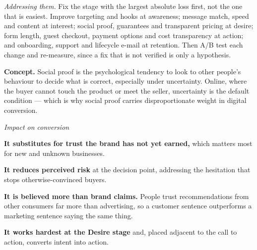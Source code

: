 \begin{qlist}
\textit{Addressing them.} Fix the stage with the largest absolute loss first,
not the one that is easiest. Improve targeting and hooks at awareness; message
match, speed and content at interest; social proof, guarantees and transparent
pricing at desire; form length, guest checkout, payment options and cost
transparency at action; and onboarding, support and lifecycle e-mail at
retention. Then A/B test each change and re-measure, since a fix that is not
verified is only a hypothesis.

\textbf{Concept.} Social proof is the psychological tendency to look to other
people's behaviour to decide what is correct, especially under uncertainty.
Online, where the buyer cannot touch the product or meet the seller, uncertainty
is the default condition --- which is why social proof carries
disproportionate weight in digital conversion.

\textit{Impact on conversion}
\begin{apts}
\item \textbf{It substitutes for trust the brand has not yet earned,} which
      matters most for new and unknown businesses.
\item \textbf{It reduces perceived risk} at the decision point, addressing the
      hesitation that stops otherwise-convinced buyers.
\item \textbf{It is believed more than brand claims.} People trust
      recommendations from other consumers far more than advertising, so a
      customer sentence outperforms a marketing sentence saying the same thing.
\item \textbf{It works hardest at the Desire stage} and, placed adjacent to the
      call to action, converts intent into action.
\end{apts}


\end{qlist}
